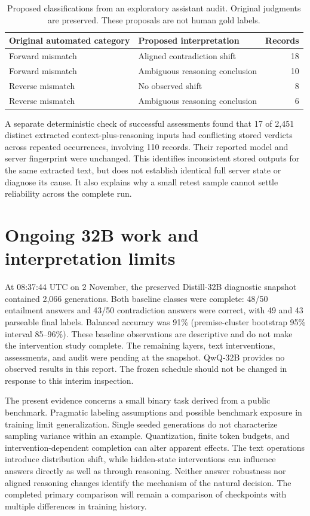 \documentclass[10pt]{article}
\begin{document}
\begin{table}[htbp]
\centering
\caption{Proposed classifications from an exploratory assistant audit.
Original judgments are preserved. These proposals are not human gold labels.}
\label{tab:audit}
\begin{tabular}{llr}
\toprule
Original automated category & Proposed interpretation & Records\\
\midrule
Forward mismatch & Aligned contradiction shift & 18\\
Forward mismatch & Ambiguous reasoning conclusion & 10\\
Reverse mismatch & No observed shift & 8\\
Reverse mismatch & Ambiguous reasoning conclusion & 6\\
\bottomrule
\end{tabular}
\end{table}

A separate deterministic check of successful assessments found that 17 of
2,451 distinct extracted context-plus-reasoning inputs had conflicting stored
verdicts across repeated occurrences, involving 110 records. Their reported
model and server fingerprint were unchanged. This identifies inconsistent
stored outputs for the same extracted text, but does not establish identical
full server state or diagnose its cause. It also explains why a small retest
sample cannot settle reliability across the complete run.

\section{Ongoing 32B work and interpretation limits}
At 08:37:44 UTC on 2 November, the preserved Distill-32B diagnostic snapshot
contained 2,066 generations. Both baseline classes were complete: 48/50
entailment answers and 43/50 contradiction answers were correct, with 49 and 43
parseable final labels. Balanced accuracy was 91\% (premise-cluster bootstrap
95\% interval 85--96\%). These baseline observations are descriptive and do not
make the intervention study complete. The remaining layers, text interventions,
assessments, and audit were pending at the snapshot. QwQ-32B provides no observed
results in this report. The frozen schedule should not be changed in response
to this interim inspection.

The present evidence concerns a small binary task derived from a public benchmark.
Pragmatic labeling assumptions and possible benchmark exposure in training limit
generalization. Single seeded generations do not characterize sampling variance
within an example. Quantization, finite token budgets, and intervention-dependent
completion can alter apparent effects. The text operations introduce distribution
shift, while hidden-state interventions can influence answers directly as well as
through reasoning. Neither answer robustness nor aligned reasoning changes identify
the mechanism of the natural decision. The completed primary comparison will
remain a comparison of checkpoints with multiple differences in training history.
\end{document}
